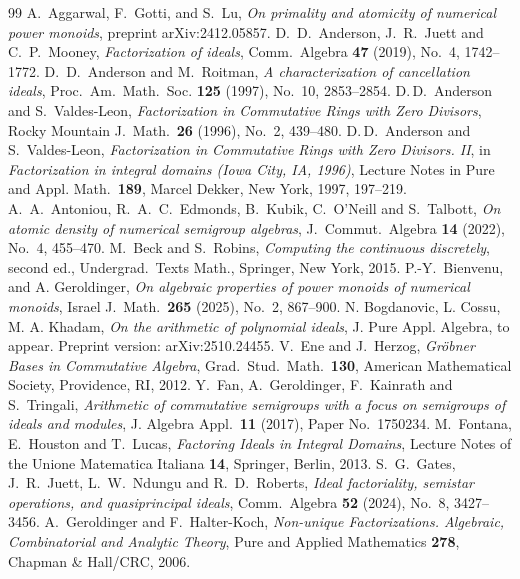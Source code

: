 \documentclass[a4paper,10pt,reqno]{amsart}
\theoremstyle{definition}
\theoremstyle{definition}
\begin{document}
\begin{thebibliography}{99}
 A.~Aggarwal, F.~Gotti, and S.~Lu, \textit{On primality and atomicity of numerical power monoids}, preprint arXiv:2412.05857.
%
 D.~D.~Anderson, J.~R.~Juett and C.~P.~Mooney, \emph{Factorization of ideals}, Comm.~Algebra \textbf{47} (2019), No.~4, 1742--1772.
%
 D.~D.~Anderson  and M.~Roitman, \emph{A characterization of cancellation ideals}, Proc.~Am.~Math.~Soc. \textbf{125} (1997), No.~10, 2853--2854.
%
 D.\,D.~Anderson and S.~Valdes-Leon, \emph{Factorization in Commutative Rings with Zero Divisors}, Rocky Mountain J.~Math.~\textbf{26} (1996), No.~2, 439--480.
%
 D.\,D.~Anderson and S.~Valdes-Leon, \emph{Factorization in Commutative Rings with Zero Divisors. II}, in \emph{Factorization in integral domains (Iowa City, IA, 1996)}, Lecture Notes in Pure and Appl. Math.~\textbf{189}, Marcel Dekker, New York, 1997, 197--219.
%
 A.~A.~Antoniou, R.~A.~C.~Edmonds, B.~Kubik, C.~O'Neill and S.~Talbott, \emph{On atomic density of numerical semigroup algebras}, J.~Commut.~Algebra \textbf{14} (2022), No.~4, 455--470.
%
 M.~Beck and S.~Robins, \emph{Computing the continuous discretely}, second ed., Undergrad.~Texts Math., Springer, New York, 2015.%
%
 P.-Y.~Bienvenu,  and A. Geroldinger, \emph{On algebraic properties of power monoids of numerical monoids}, Israel J.~Math.~\textbf{265} (2025), No.~2, 867--900.
%
 N. Bogdanovic, L. Cossu, M. A. Khadam, \emph{On the arithmetic of polynomial ideals}, J. Pure Appl. Algebra, to appear. Preprint version: arXiv:2510.24455.
%
 V.~Ene and J.~Herzog, \emph{Gr\"obner Bases in Commutative Algebra}, Grad.~Stud.~Math.~\textbf{130}, American Mathematical Society, Providence, RI, 2012.
%
 Y.~Fan, A.~Geroldinger, F.~Kainrath and S.~Tringali, \emph{Arithmetic of commutative semigroups with a
focus on semigroups of ideals and modules}, J. Algebra Appl.~\textbf{11} (2017), Paper No.~1750234.
%
   M.~Fontana, E.~Houston and T.~Lucas, \emph{Factoring Ideals in Integral Domains}, Lecture Notes of the Unione Matematica Italiana \textbf{14}, Springer, Berlin, 2013.
%
 S.~G.~Gates, J.~R.~Juett, L.~W.~Ndungu and R.~D.~Roberts, \emph{Ideal factoriality, semistar operations, and quasiprincipal ideals}, Comm.~Algebra \textbf{52} (2024), No.~8, 3427--3456.
%
 A.~Geroldinger and F.~Halter-Koch, \emph{Non-unique Factorizations. Algebraic, Combinatorial and Analytic Theory}, Pure and Applied Mathematics \textbf{278}, Chapman \& Hall/CRC, 2006.

\end{thebibliography}
\end{document}
